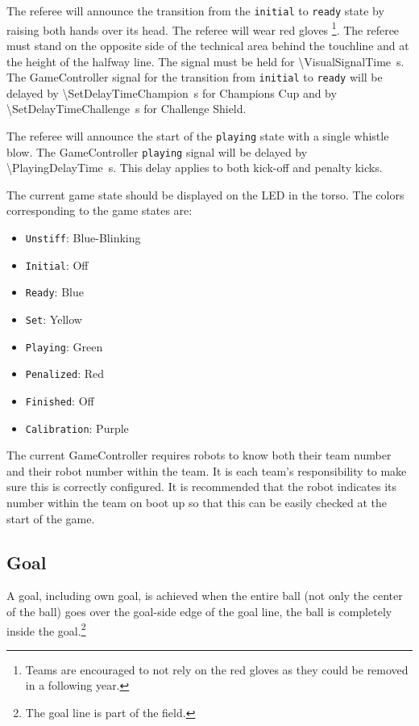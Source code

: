 The referee will announce the transition from the \texttt{initial} to \texttt{ready} state by raising both hands over its head. The referee will wear red gloves \footnote{Teams are encouraged to not rely on the red gloves as they could be removed in a following year.}.
The referee must stand on the opposite side of the technical area behind the touchline and at the height of the halfway line.
The signal must be held for \qty{\VisualSignalTime}{\second}.
The GameController signal for the transition from \texttt{initial} to \texttt{ready} will be delayed by \qty{\SetDelayTimeChampion}{\second} for Champions Cup and by \qty{\SetDelayTimeChallenge}{\second} for Challenge Shield.


The referee will announce the start of the \texttt{playing} state with a single whistle blow.
The GameController \texttt{playing} signal will be delayed by \qty{\PlayingDelayTime}{\second}.
This delay applies to both kick-off and penalty kicks.

The current game state should be displayed on the LED in the torso.
The colors corresponding to the game states are:
\begin{itemize}
  \item \texttt{Unstiff}: Blue-Blinking
  \item \texttt{Initial}: Off
  \item \texttt{Ready}: Blue
  \item \texttt{Set}: Yellow
  \item \texttt{Playing}: Green
  \item \texttt{Penalized}: Red
  \item \texttt{Finished}: Off
  \item \texttt{Calibration}: Purple
\end{itemize}

The current GameController requires robots to know both their team number and their robot number within the team.
It is each team's responsibility to make sure this is correctly configured.
It is recommended that the robot indicates its number within the team on boot up so that this can be easily checked at the start of the game.

\subsection{Goal}
\label{sec:goal}

A goal, including own goal, is achieved when the entire ball (not only the center of the ball) goes over the goal-side edge of the goal line, \ie the ball is completely inside the goal.\footnote{
  The goal line is part of the field.
}

